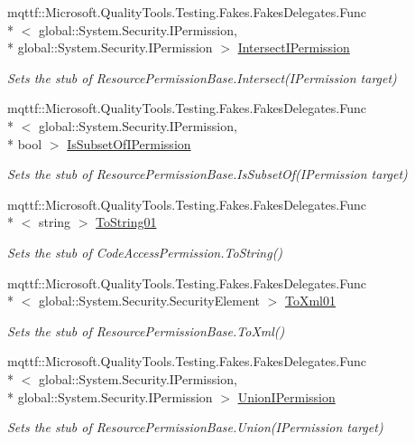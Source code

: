 \begin{DoxyCompactItemize}
mqttf\-::\-Microsoft.\-Quality\-Tools.\-Testing.\-Fakes.\-Fakes\-Delegates.\-Func\\*
$<$ global\-::\-System.\-Security.\-I\-Permission, \\*
global\-::\-System.\-Security.\-I\-Permission $>$ \hyperlink{class_system_1_1_security_1_1_permissions_1_1_fakes_1_1_stub_resource_permission_base_a0cd916e15a65e1ad0f475c979e255f8f}{Intersect\-I\-Permission}
\begin{DoxyCompactList}\small\item\em Sets the stub of Resource\-Permission\-Base.\-Intersect(\-I\-Permission target)\end{DoxyCompactList}\item 
mqttf\-::\-Microsoft.\-Quality\-Tools.\-Testing.\-Fakes.\-Fakes\-Delegates.\-Func\\*
$<$ global\-::\-System.\-Security.\-I\-Permission, \\*
bool $>$ \hyperlink{class_system_1_1_security_1_1_permissions_1_1_fakes_1_1_stub_resource_permission_base_ae34a991186dd822d0f7ff5dbc7c9f17f}{Is\-Subset\-Of\-I\-Permission}
\begin{DoxyCompactList}\small\item\em Sets the stub of Resource\-Permission\-Base.\-Is\-Subset\-Of(\-I\-Permission target)\end{DoxyCompactList}\item 
mqttf\-::\-Microsoft.\-Quality\-Tools.\-Testing.\-Fakes.\-Fakes\-Delegates.\-Func\\*
$<$ string $>$ \hyperlink{class_system_1_1_security_1_1_permissions_1_1_fakes_1_1_stub_resource_permission_base_adb8fc9bbc7d691b8b849f16e8893f133}{To\-String01}
\begin{DoxyCompactList}\small\item\em Sets the stub of Code\-Access\-Permission.\-To\-String()\end{DoxyCompactList}\item 
mqttf\-::\-Microsoft.\-Quality\-Tools.\-Testing.\-Fakes.\-Fakes\-Delegates.\-Func\\*
$<$ global\-::\-System.\-Security.\-Security\-Element $>$ \hyperlink{class_system_1_1_security_1_1_permissions_1_1_fakes_1_1_stub_resource_permission_base_af6ad443dc2c2ac55ea7147a5c3a960d2}{To\-Xml01}
\begin{DoxyCompactList}\small\item\em Sets the stub of Resource\-Permission\-Base.\-To\-Xml()\end{DoxyCompactList}\item 
mqttf\-::\-Microsoft.\-Quality\-Tools.\-Testing.\-Fakes.\-Fakes\-Delegates.\-Func\\*
$<$ global\-::\-System.\-Security.\-I\-Permission, \\*
global\-::\-System.\-Security.\-I\-Permission $>$ \hyperlink{class_system_1_1_security_1_1_permissions_1_1_fakes_1_1_stub_resource_permission_base_ab805313ce0295eab0dd91328eefe1fd7}{Union\-I\-Permission}
\begin{DoxyCompactList}\small\item\em Sets the stub of Resource\-Permission\-Base.\-Union(\-I\-Permission target)\end{DoxyCompactList}\end{DoxyCompactItemize}
